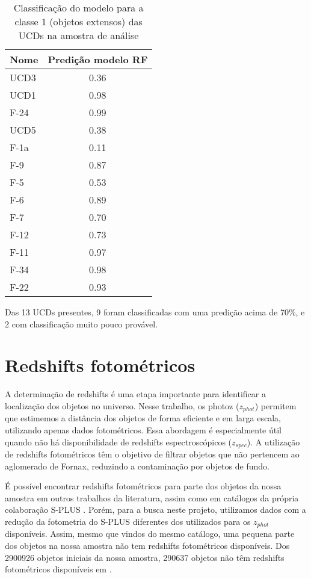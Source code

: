 \begin{table}[H]
    \centering
    \caption{Classificação do modelo para a classe 1 (objetos extensos) das UCDs na amostra de análise}  
    \begin{tabular}{lc}
        \toprule
        Nome & Predição modelo RF \\
        \midrule
        UCD3 & 0.36 \\
        UCD1 & 0.98 \\
        F-24 & 0.99 \\
        UCD5 & 0.38 \\
        F-1a & 0.11 \\
        F-9 & 0.87 \\
        F-5 & 0.53 \\
        F-6 & 0.89 \\
        F-7 & 0.70 \\
        F-12 & 0.73 \\
        F-11 & 0.97 \\
        F-34 & 0.98 \\
        F-22 & 0.93 \\
        \bottomrule
    \end{tabular}
    \label{ucds_predict}
\end{table}

Das 13 UCDs presentes, 9 foram classificadas com uma predição acima de 70\%, e 2 com classificação muito pouco provável. 

\section{Redshifts fotométricos}\label{sec:zphot}

A determinação de redshifts é uma etapa importante para identificar a localização dos objetos no universo. Nesse trabalho, os \ac{photoz} (\textit{$z_{phot}$}) permitem que estimemos a distância dos objetos de forma eficiente e em larga escala, utilizando apenas dados fotométricos. Essa abordagem é especialmente útil quando não há disponibilidade de redshifts espectroscópicos (\textit{$z_{spec}$}). A utilização de redshifts fotométricos têm o objetivo de filtrar objetos que não pertencem ao aglomerado de Fornax, reduzindo a contaminação por objetos de fundo.

É possível encontrar redshifts fotométricos para parte dos objetos da nossa amostra em outros trabalhos da literatura, assim como em catálogos da própria colaboração S-PLUS \citep{erik_photoz_2024}. Porém, para a busca neste projeto, utilizamos dados com a redução da fotometria do S-PLUS diferentes dos utilizados para os \textit{$z_{phot}$} disponíveis. Assim, mesmo que vindos do mesmo catálogo, uma pequena parte dos objetos na nossa amostra não tem redshifts fotométricos disponíveis. Dos 2900926 objetos iniciais da nossa amostra, 290637 objetos não têm redshifts fotométricos disponíveis em \citep{erik_photoz_2024}.

